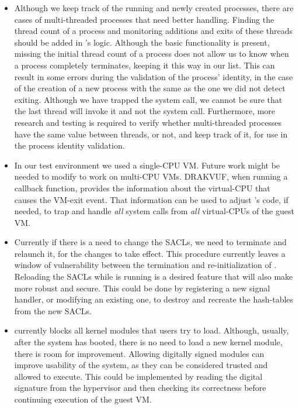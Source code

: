 \begin{itemize}

\item Although we keep track of the running and newly created processes, there are cases of multi-threaded processes that need better handling. Finding the thread count of a process and monitoring additions and exits of these threads should be added in 's logic. Although the basic functionality is present, missing the initial thread count of a process does not allow us to know when a process completely terminates, keeping it this way in our list. This can result in some errors during the validation of the process' identity, in the case of the creation of a new process with the same  as the one we did not detect exiting. Although we have trapped the  system call, we cannot be sure that the last thread will invoke it and not the  system call.
Furthermore, more research and testing is required to verify whether multi-threaded processes have the same  value between threads, or not, and keep track of it, for use in the process identity validation.


\item In our test environment we used a single-\ac{CPU} \ac{VM}. Future work might be needed to modify  to work on multi-\ac{CPU} \acp{VM}. DRAKVUF, when running a callback function, provides the information about the virtual-\ac{CPU} that causes the \ac{VM}-exit event. That information can be used to adjust 's code, if needed, to trap and handle \emph{all} system calls from \emph{all} virtual-\acp{CPU} of the guest \ac{VM}.

\item Currently if there is a need to change the \acp{SACL}, we need to terminate  and relaunch it, for the changes to take effect. This procedure currently leaves a window of vulnerability between the termination and re-initialization of . Reloading the \acp{SACL} while  is running is a desired feature that will also make  more robust and secure. This could be done by registering a new signal handler, or modifying an existing one, to destroy and recreate the hash-tables from the new \acp{SACL}.

\item {} currently blocks all kernel modules that users try to load. Although, usually, after the system has booted, there is no need to load a new kernel module, there is room for improvement. Allowing digitally signed modules can improve usability of the system, as they can be considered trusted and allowed to execute. This could be implemented by reading the digital signature from the hypervisor and then checking its correctness before continuing execution of the guest \ac{VM}.


\end{itemize}
